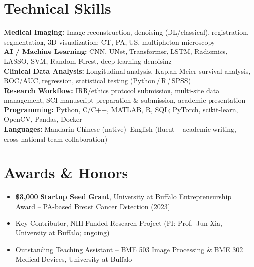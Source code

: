 \documentclass[letterpaper,10pt]{article}
\begin{document}
\section{Technical Skills}
\noindent
\small
\textbf{Medical Imaging:} Image reconstruction, denoising (DL/classical), registration, segmentation, 3D visualization; CT, PA, US, multiphoton microscopy \\
\textbf{AI / Machine Learning:} CNN, UNet, Transformer, LSTM, Radiomics, LASSO, SVM, Random Forest, deep learning denoising \\
\textbf{Clinical Data Analysis:} Longitudinal analysis, Kaplan-Meier survival analysis, ROC/AUC, regression, statistical testing (Python\,/\,R\,/\,SPSS) \\
\textbf{Research Workflow:} IRB/ethics protocol submission, multi-site data management, SCI manuscript preparation \& submission, academic presentation \\
\textbf{Programming:} Python, C/C++, MATLAB, R, SQL; PyTorch, scikit-learn, OpenCV, Pandas, Docker \\
\textbf{Languages:} Mandarin Chinese (native), English (fluent -- academic writing, cross-national team collaboration)

\vspace{-2pt}

\section{Awards \& Honors}
\begin{itemize}[leftmargin=0.2in, itemsep=1pt]
  \item \small \textbf{\$3,000 Startup Seed Grant}, University at Buffalo Entrepreneurship Award -- PA-based Breast Cancer Detection (2023)
  \item \small Key Contributor, NIH-Funded Research Project (PI: Prof.\ Jun Xia, University at Buffalo; ongoing)
  \item \small Outstanding Teaching Assistant -- BME 503 Image Processing \& BME 302 Medical Devices, University at Buffalo
\end{itemize}
\end{document}
